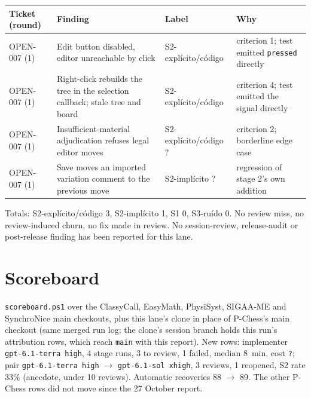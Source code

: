 \documentclass[11pt,a4paper]{article}
\begin{document}
{\small\noindent
\begin{tabularx}{\linewidth}{@{}>{\raggedright\arraybackslash}p{1.6cm}X>{\raggedright\arraybackslash}p{2.7cm}X@{}}
\toprule
Ticket (round) & Finding & Label & Why \\
\midrule
OPEN-007 (1) & Edit button disabled, editor unreachable by click & S2-explícito/\allowbreak código & criterion 1; test emitted \texttt{pressed} directly \\
OPEN-007 (1) & Right-click rebuilds the tree in the selection callback; stale tree and board & S2-explícito/\allowbreak código & criterion 4; test emitted the signal directly \\
OPEN-007 (1) & Insufficient-material adjudication refuses legal editor moves & S2-explícito/\allowbreak código ? & criterion 2; borderline edge case \\
OPEN-007 (1) & Save moves an imported variation comment to the previous move & S2-implícito ? & regression of stage 2's own addition \\
\bottomrule
\end{tabularx}
}

Totals: S2-explícito/código 3, S2-implícito 1, S1 0, S3-ruído 0. No review miss, no
review-induced churn, no fix made in review. No session-review, release-audit or post-release
finding has been reported for this lane.

\section*{Scoreboard}

\texttt{scoreboard.ps1} over the ClassyCall, EasyMath, PhysiSyst, SIGAA-ME and SynchroNice main
checkouts, plus this lane's clone in place of P-Chess's main checkout (same merged run log; the
clone's session branch holds this run's attribution rows, which reach \texttt{main} with this
report). New rows: implementer \texttt{gpt-6.1-terra high}, 4 stage runs, 3 to review, 1 failed,
median 8~min, cost \texttt{?}; pair \texttt{gpt-6.1-terra high} $\rightarrow$
\texttt{gpt-6.1-sol xhigh}, 3 reviews, 1 reopened, S2 rate 33\% (anecdote, under 10 reviews).
Automatic recoveries 88 $\to$ 89. The other P-Chess rows did not move since the 27 October
report.
\end{document}
